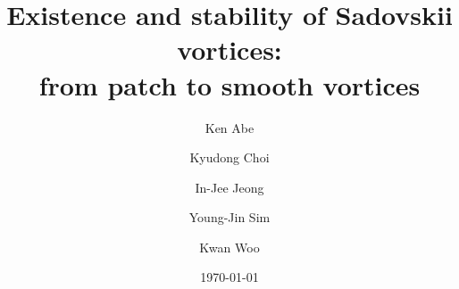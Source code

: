 \documentclass[11pt]{amsart}
\theoremstyle{definition}
\theoremstyle{definition}
\numberwithin{equation}{section}
\newcommand{\0}{\emptyset}
\begin{document}
	
	\title{Existence and stability of Sadovskii vortices:\\
    from patch to smooth vortices}%
	
	\author{Ken Abe}
	\address{Department of Mathematics, Graduate School of Science, Osaka Metropolitan University, 3-3-138 Sugimoto, Sumiyoshi-ku Osaka, 558-8585, Japan.}
	
	\author{Kyudong Choi}
	\address{Department of Mathematical Sciences, Ulsan National Institute of Science and Technology, 50 UNIST-gil, Eonyang-eup, Ulju-gun, Ulsan 44919, Republic of Korea.}
	
	\author{In-Jee Jeong}
	\address{School of Mathematics, Korea Institute for Advanced Study, 85 Heogi-ro, Seoul 02455, Republic of Korea.}
	
	\author{Young-Jin Sim}
	\address{School of Mathematics, Korea Institute for Advanced Study, 85 Heogi-ro, Seoul 02455, Republic of Korea.}
	
	\author{Kwan Woo}
	\address{Departement Mathematik und Informatik, Universit\"at Basel, CH-4051 Basel, Switzerland.}
	
	\date{\today}
	
	\renewcommand{\thefootnote}{\fnsymbol{footnote}}
	
	
	\renewcommand{\thefootnote}{\arabic{footnote}}
	
	
\end{document}
